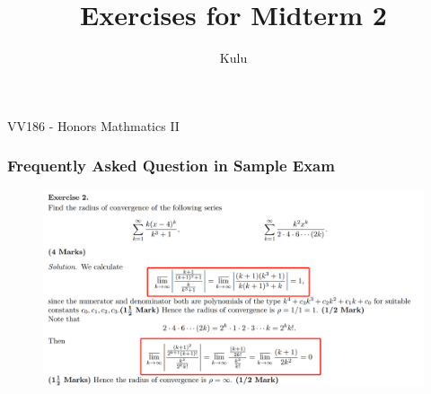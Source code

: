 \documentclass{beamer}
\title{\sffamily Exercises for Midterm 2}
\institute[UM-SJTU JI]{University of Michigan-Shanghai Jiao Tong University Joint Institute}
\author{Kulu}
\newcommand{\myfont}{\rmfamily\normalsize\upshape\mdseries}
\begin{document}
\begin{titlepage}
    \begin{center}
        VV186 - Honors Mathmatics II
    \end{center}
\end{titlepage}
\myfont

\begin{frame}
    \frametitle{Frequently Asked Question in Sample Exam}
    \begin{figure}
        \centering
        \includegraphics[width=1\textwidth]{question.png}
    \end{figure}

\end{frame}
\end{document}
